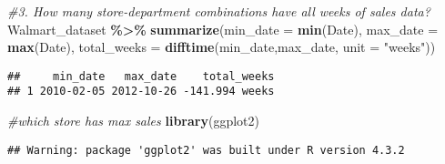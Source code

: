 \documentclass[
]{article}
\newenvironment{Shaded}{\begin{snugshade}}{\end{snugshade}}
\newcommand{\AttributeTok}[1]{\textcolor[rgb]{0.13,0.29,0.53}{#1}}
\newcommand{\CommentTok}[1]{\textcolor[rgb]{0.56,0.35,0.01}{\textit{#1}}}
\newcommand{\FunctionTok}[1]{\textcolor[rgb]{0.13,0.29,0.53}{\textbf{#1}}}
\newcommand{\NormalTok}[1]{#1}
\newcommand{\SpecialCharTok}[1]{\textcolor[rgb]{0.81,0.36,0.00}{\textbf{#1}}}
\newcommand{\StringTok}[1]{\textcolor[rgb]{0.31,0.60,0.02}{#1}}
\begin{document}
\begin{Shaded}
\begin{Highlighting}[]
\CommentTok{\#3. How many store{-}department combinations have all weeks of sales data?}
\NormalTok{Walmart\_dataset }\SpecialCharTok{\%\textgreater{}\%} \FunctionTok{summarize}\NormalTok{(}\AttributeTok{min\_date =} \FunctionTok{min}\NormalTok{(Date), }\AttributeTok{max\_date =} \FunctionTok{max}\NormalTok{(Date), }
                    \AttributeTok{total\_weeks =} \FunctionTok{difftime}\NormalTok{(min\_date,max\_date, }\AttributeTok{unit =} \StringTok{"weeks"}\NormalTok{))}
\end{Highlighting}
\end{Shaded}

\begin{verbatim}
##     min_date   max_date    total_weeks
## 1 2010-02-05 2012-10-26 -141.994 weeks
\end{verbatim}

\begin{Shaded}
\begin{Highlighting}[]
\CommentTok{\#which store has max sales }
\FunctionTok{library}\NormalTok{(ggplot2)}
\end{Highlighting}
\end{Shaded}

\begin{verbatim}
## Warning: package 'ggplot2' was built under R version 4.3.2
\end{verbatim}
\end{document}
